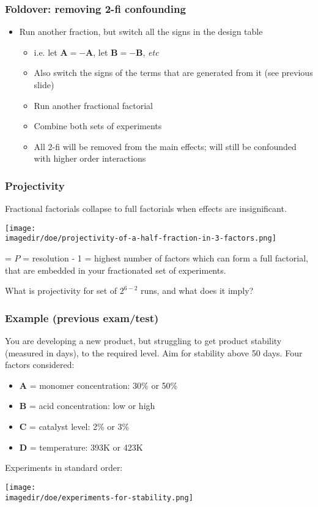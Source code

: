 \begin{frame}\frametitle{Foldover: removing 2-fi confounding}
	\begin{itemize}
		\item	Run another fraction, but switch all the signs in the design table
		\begin{itemize}
			\item	i.e. let $\mathbf{A} = \mathbf{-A}$, let $\mathbf{B} = \mathbf{-B}$, \emph{etc}
			\item	Also switch the signs of the terms that are generated from it (see previous slide)
			\item	Run another fractional factorial
			\item	Combine both sets of experiments
			\item	All 2-fi will be removed from the main effects; will still be confounded with higher order interactions
		\end{itemize}
	\end{itemize}
\end{frame}

\begin{frame}\frametitle{Projectivity}

	Fractional factorials collapse to full factorials when effects are insignificant.
	\begin{center}
		\texttt{[image: \\imagedir/doe/projectivity-of-a-half-fraction-in-3-factors.png]}
	\end{center}
	{\color{purple}{Projectivity}} = $P$ = resolution - 1 = highest number of factors which can form a full factorial, that are embedded in your fractionated set of experiments.
	
	\vspace{12pt}
	What is projectivity for set of $2^{6-2}$ runs, and what does it imply?
\end{frame}

\begin{frame}\frametitle{Example (previous exam/test)}

	You are developing a new product, but struggling to get product stability (measured in days), to the required level. Aim for stability above 50 days. Four factors considered:
	\begin{itemize}
		\item	\textbf{A} = monomer concentration: 30\% or 50\%
		\item	\textbf{B} = acid concentration: low or high
		\item	\textbf{C} = catalyst level: 2\% or 3\%
		\item	\textbf{D} = temperature: 393K or 423K
	\end{itemize}

	Experiments in standard order:
	\begin{center}
		\texttt{[image: \\imagedir/doe/experiments-for-stability.png]}
	\end{center}
\end{frame}

